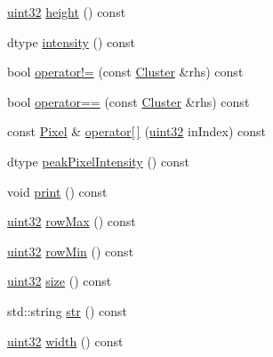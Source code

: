 \begin{DoxyCompactItemize}
\mbox{\hyperlink{namespace_num_cpp_a36f388e948380413c63011cab9b7fbd5}{uint32}} \mbox{\hyperlink{class_num_cpp_1_1_image_processing_1_1_cluster_a342ed01e86ca4394d63c725391ebaa3b}{height}} () const
\item 
dtype \mbox{\hyperlink{class_num_cpp_1_1_image_processing_1_1_cluster_a7d982eabfd9d738cff4cc4f77383550f}{intensity}} () const
\item 
bool \mbox{\hyperlink{class_num_cpp_1_1_image_processing_1_1_cluster_a5e8ef353e90cb46a52a15618d4e3da65}{operator!=}} (const \mbox{\hyperlink{class_num_cpp_1_1_image_processing_1_1_cluster}{Cluster}} \&rhs) const
\item 
bool \mbox{\hyperlink{class_num_cpp_1_1_image_processing_1_1_cluster_aa6de265ccddeda2db7a328e21cab030c}{operator==}} (const \mbox{\hyperlink{class_num_cpp_1_1_image_processing_1_1_cluster}{Cluster}} \&rhs) const
\item 
const \mbox{\hyperlink{class_num_cpp_1_1_image_processing_1_1_pixel}{Pixel}} \& \mbox{\hyperlink{class_num_cpp_1_1_image_processing_1_1_cluster_a6c7f0e8f7eebb136c9b672051eef6ce5}{operator\mbox{[}$\,$\mbox{]}}} (\mbox{\hyperlink{namespace_num_cpp_a36f388e948380413c63011cab9b7fbd5}{uint32}} in\+Index) const
\item 
dtype \mbox{\hyperlink{class_num_cpp_1_1_image_processing_1_1_cluster_a05910790dbdeebaa24f0a04d4ae5d176}{peak\+Pixel\+Intensity}} () const
\item 
void \mbox{\hyperlink{class_num_cpp_1_1_image_processing_1_1_cluster_a19a6271d2539f5e19a0d36a3fe7ce224}{print}} () const
\item 
\mbox{\hyperlink{namespace_num_cpp_a36f388e948380413c63011cab9b7fbd5}{uint32}} \mbox{\hyperlink{class_num_cpp_1_1_image_processing_1_1_cluster_a85fab78cc81b27b60905bfa6515d4ffb}{row\+Max}} () const
\item 
\mbox{\hyperlink{namespace_num_cpp_a36f388e948380413c63011cab9b7fbd5}{uint32}} \mbox{\hyperlink{class_num_cpp_1_1_image_processing_1_1_cluster_a2040e13a30db15f57b0158c2dbbe928c}{row\+Min}} () const
\item 
\mbox{\hyperlink{namespace_num_cpp_a36f388e948380413c63011cab9b7fbd5}{uint32}} \mbox{\hyperlink{class_num_cpp_1_1_image_processing_1_1_cluster_a2bc0bdc7e0badf9d7487850b3df24289}{size}} () const
\item 
std\+::string \mbox{\hyperlink{class_num_cpp_1_1_image_processing_1_1_cluster_a92406c7e147b2a3e649f30ce40f5a53f}{str}} () const
\item 
\mbox{\hyperlink{namespace_num_cpp_a36f388e948380413c63011cab9b7fbd5}{uint32}} \mbox{\hyperlink{class_num_cpp_1_1_image_processing_1_1_cluster_a799065eaa2e5cf4244caadd2c80b6f39}{width}} () const
\end{DoxyCompactItemize}
